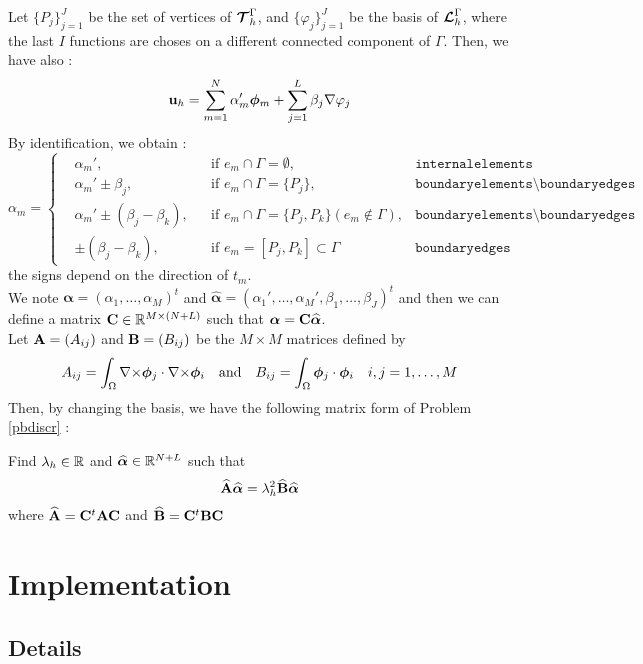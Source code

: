 Let $\{P_j\}_{j=1}^J$ be the set of vertices of ${\bm{\mathcal{T}}}_h^\Gamma$, and
$\{\varphi_j\}_{j=1}^J$ be the basis of ${\bm{\mathcal{L}}}_h^\Gamma$, where the last $I$
functions are choses on a different connected component of $\Gamma$. Then, we have also :
\[ {\mathbf{u}}_h = \sum_{m=1}^N \alpha_m'\bm{\phi}_m + \sum_{j=1}^L
\beta_j{\nabla}\varphi_j \]
By identification, we obtain :
\[
\alpha_m=\left\{\begin{aligned}
&\alpha_m', &&\mbox{if } e_m\cap\Gamma = \emptyset, &\texttt{internalelements}\\
&\alpha_m'\pm \beta_j, &&\mbox{if } e_m\cap\Gamma = \{P_j\},& \texttt{boundaryelements}\setminus\texttt{boundaryedges}\\
&\alpha_m'\pm (\beta_j-\beta_k), &&\mbox{if } e_m\cap\Gamma = \{P_j,P_k\}
(e_m\notin\Gamma),& \texttt{boundaryelements}\setminus\texttt{boundaryedges}\\
&\pm (\beta_j-\beta_k), &&\mbox{if } e_m=[P_j,P_k]\subset\Gamma & \texttt{boundaryedges}
\end{aligned}\right.
\]
the signs depend on the direction of $t_m$.\\

We note $\bm{\alpha}=(\alpha_1,\dots,\alpha_M)^t$ and
$\widehat{\bm{\alpha}}=(\alpha_1',\dots,\alpha_M',\beta_1,\dots,\beta_J)^t$ and
then we can define a matrix ${\mathbf{C}}\in{\mathbb{R}}^{M\times(N+L)}$ such that $\bm{\alpha}={\mathbf{C}}\widehat{\bm{\alpha}}$.\\

Let ${\mathbf{A}}=(A_{ij})$ and ${\mathbf{B}}=(B_{ij})$ be the $M\times M$ matrices defined
by 
\[A_{ij}=\int_\Omega {\nabla\times}\bm{\phi}_j\cdot{\nabla\times}\bm{\phi}_i \quad\mbox{and}\quad
B_{ij}=\int_\Omega\bm{\phi}_j\cdot\bm{\phi}_i\quad i,j=1,\dots,M \]
Then, by changing the basis, we have the following matrix form of Problem
\ref{pbdiscr} :
\begin{pb}\label{pbmat}
Find $\lambda_h\in{\mathbb{R}}$ and $\widehat{\bm{\alpha}}\in{\mathbb{R}}^{N+L}$ such that
\[ \widehat{{\mathbf{A}}}\widehat{\bm{\alpha}} =
\lambda_h^2\widehat{{\mathbf{B}}}\widehat{\bm{\alpha}} \]
where $\widehat{{\mathbf{A}}}={\mathbf{C}}^t{\mathbf{A}}{\mathbf{C}}$ and $\widehat{{\mathbf{B}}}={\mathbf{C}}^t{\mathbf{B}}{\mathbf{C}}$
\end{pb}

\section{Implementation}
\subsection{Details}

